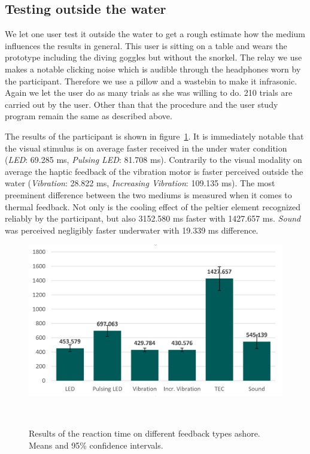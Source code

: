 \subsection{Testing outside the water}

We let one user test it outside the water to get a rough estimate how the medium influences the results in general.
This user is sitting on a table and wears the prototype including the diving goggles but without the snorkel.
The relay we use makes a notable clicking noise which is audible through the headphones worn by the participant.
Therefore we use a pillow and a wastebin to make it infrasonic.
Again we let the user do as many trials as she was willing to do.
210 trials are carried out by the user.
Other than that the procedure and the user study program remain the same as described above.

The results of the participant is shown in figure~\ref{fig:user12}.
It is immediately notable that the visual stimulus is on average faster received in the under water condition (\emph{LED}: 69.285 ms, \emph{Pulsing LED}: 81.708 ms).
Contrarily to the visual modality on average the haptic feedback of the vibration motor is faster perceived outside the water (\emph{Vibration}: 28.822 ms, \emph{Increasing Vibration}: 109.135 ms).
The most preeminent difference between the two mediums is measured when it comes to thermal feedback.
Not only is the cooling effect of the peltier element recognized reliably by the participant, but also 3152.580 ms faster with 1427.657 ms.
\emph{Sound} was perceived negligibly faster underwater with 19.339 ms difference.

\begin{figure}
	\includegraphics[width=\columnwidth]{images/ResultsOfReactionTimesUser12.png}
	\caption{Results of the reaction time on different feedback types ashore. Means and 95\% confidence intervals. }~\label{fig:user12}
\end{figure}

